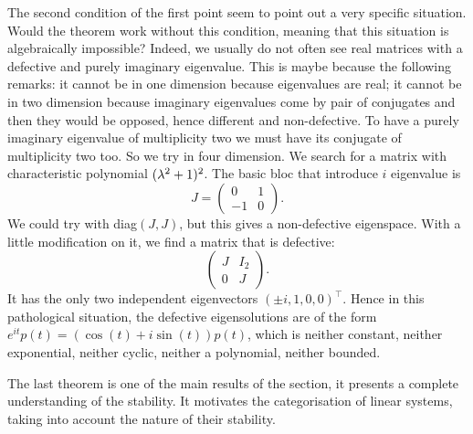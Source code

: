 \begin{exemple}
     The second condition of the first point seem to point out a very specific situation. Would the theorem work without this condition, meaning that this situation is algebraically impossible? Indeed, we usually do not often see real matrices with a defective and purely imaginary eigenvalue. This is maybe because the following remarks: it cannot be in one dimension because eigenvalues are real; it cannot be in two dimension because imaginary eigenvalues come by pair of conjugates and then they would be opposed, hence different and non-defective. To have a purely imaginary eigenvalue of multiplicity two we must have its conjugate of multiplicity two too. So we try in four dimension. We search for a matrix with characteristic polynomial $(\lambda^2+1)^2$. The basic bloc that introduce $i$ eigenvalue is 
     $$J=\begin{pmatrix}0&1\\-1&0\end{pmatrix}.$$
     We could try with diag$(J,J)$, but this gives a non-defective eigenspace. With a little modification on it, we find a matrix that is defective:
     $$\begin{pmatrix}J&I_2\\0&J\end{pmatrix}.$$
     It has the only two independent eigenvectors $(\pm i,1,0,0)^\top$. Hence in this pathological situation, the defective eigensolutions are of the form $e^{it}p(t)=(\cos(t)+i\sin(t))p(t)$, which is neither constant, neither exponential, neither cyclic, neither a polynomial, neither bounded.
\end{exemple}
The last theorem is one of the main results of the section, it presents a complete understanding of the stability. It motivates the categorisation of linear systems, taking into account the nature of their stability.
